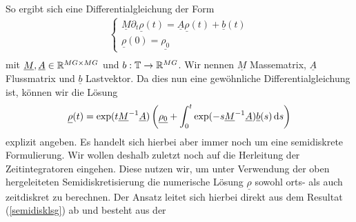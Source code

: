 So ergibt sich eine Differential\-gleichung der Form
\begin{align*}
\begin{cases}
\underline{M} \partial_t \underline{\rho}(t) = \underline{A} \underline{\rho}(t) + \underline{b}(t) \\
\underline{\rho}(0) = \underline{\rho_0}
\end{cases}\\
\end{align*}
mit $ \underline{M},\underline{A} \in \mathbb{R}^{MG\times MG} $ und $ b: \mathbb{T} \to \mathbb{R}^{MG} $. Wir nennen  $ \underline{M} $ Massematrix, $ \underline{A} $ Flussmatrix und $ \underline{b} $ Lastvektor.
Da dies nun eine gewöhnliche Differentialgleichung ist, können wir die Lösung 
\begin{align}
 \label{semidisklsg}
 \underline{\rho}(t) = \exp(t \underline{M}^{-1} \underline{A}) \left( \underline{\rho_0} + \int_{0}^{t} \exp(-s\underline{M}^{-1} \underline{A}) \underline{b}(s) \, \mathrm{d} s \right)
\end{align}
explizit angeben.
Es handelt sich hierbei aber immer noch um eine semidiskrete Formulierung. 
Wir wollen deshalb zuletzt noch auf die Herleitung der Zeitintegratoren eingehen. Diese nutzen wir, um unter Verwendung der oben hergeleiteten Semidiskretisierung die numerische Lösung $ \underline{\rho} $ sowohl orts- als auch zeitdiskret zu berechnen. Der Ansatz leitet sich hierbei direkt aus dem Resultat (\ref{semidisklsg}) ab und besteht aus der 
